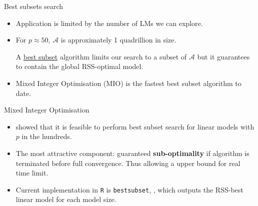 \documentclass[12pt,aspectratio=169]{beamer}
\begin{document}
\begin{frame}{Best subsets search}
\begin{itemize}
	
	\item Application is limited by the number of LMs we can explore.
	
	\item For $ p \approx 50 $, $ \mathcal{A}$ is approximately 1 quadrillion in size.
	
	\begin{mdframed}[style=MyFrame]
		A \underline{best subset} algorithm limits our search to a subset of $ \mathcal{A} $ but it guarantees to contain the global RSS-optimal model.
	\end{mdframed}
	
	\item Mixed Integer Optimisation (MIO) is the fastest best subset algorithm to date.
\end{itemize}
\end{frame}



\begin{frame}{Mixed Integer Optimisation}
\begin{itemize}
	\item \citep{Bertsimas2016} showed that it is feasible to perform best subset search for linear models with $ p $ in the hundreds.
	\item The most attractive component: guaranteed \textbf{sub-optimality} if algorithm is terminated before full convergence. Thus allowing a upper bound for real time limit.
	\item Current implementation in \texttt{R} is \texttt{bestsubset}, \citep{Hastie2017}, which outputs the RSS-best linear model for each model size. 
\end{itemize}
\end{frame}
\end{document}
